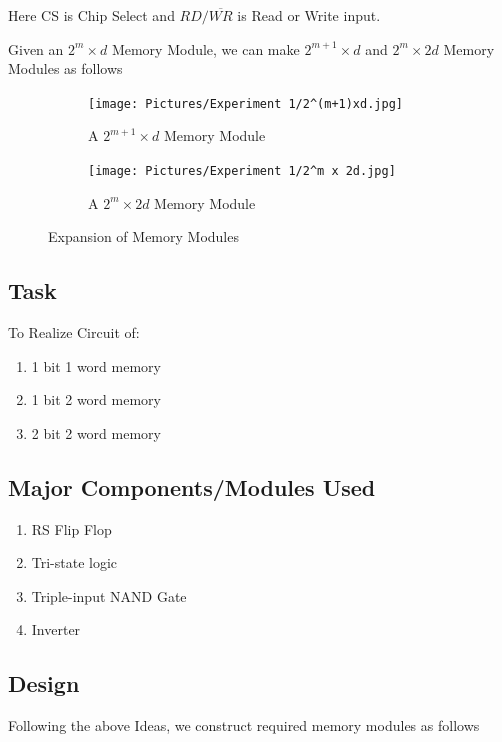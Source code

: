 \documentclass[a4paper]{article}
\begin{document}
Here CS is Chip Select  and $RD/\overline{WR}$ is Read or Write input.

Given an $2^m\times d$ Memory Module, we can make $2^{m+1}\times d$  and $2^m\times 2d$ Memory Modules as follows

\begin{figure}[h!]
    \centering
    \begin{subfigure}[b]{0.4\linewidth}
        \texttt{[image: Pictures/Experiment 1/2^(m+1)xd.jpg]}
        \caption{A $2^{m+1}\times d$ Memory Module}
    \end{subfigure}
    \begin{subfigure}[b]{0.4\linewidth}
        \texttt{[image: Pictures/Experiment 1/2^m x 2d.jpg]}
        \caption{A $2^m\times 2d$ Memory Module}
    \end{subfigure}
    \caption{Expansion of Memory Modules}
    \label{fig:ExpMemMod}
\end{figure}
\pagebreak

\subsection{Task}
To Realize Circuit of:
\begin{enumerate}[label=(\alph*)]
    \item 1 bit 1 word memory
    \item 1 bit 2 word memory
    \item 2 bit 2 word memory
\end{enumerate}

\subsection{Major Components/Modules Used}
\begin{enumerate}
    \item RS Flip Flop
    \item Tri-state logic
    \item Triple-input NAND Gate
    \item Inverter
\end{enumerate}

\subsection{Design}
Following the above Ideas, we construct required memory modules as follows
\end{document}
